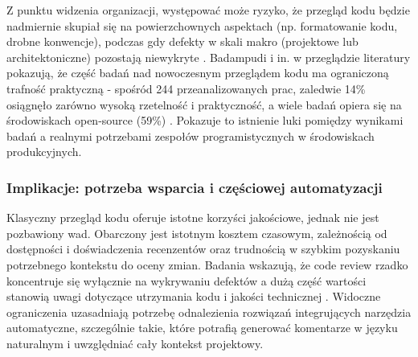 Z punktu widzenia organizacji, występować może ryzyko, że przegląd kodu będzie nadmiernie skupiał się na powierzchownych
aspektach (np. formatowanie kodu, drobne konwencje), podczas gdy defekty w skali makro (projektowe lub architektoniczne)
pozostają niewykryte \cite{bacchelli2013, czerwonka2015}.
Badampudi i in. w przeglądzie literatury pokazują, że część badań nad nowoczesnym przeglądem kodu ma ograniczoną trafność
praktyczną - spośród 244 przeanalizowanych prac, zaledwie 14\% osiągnęło zarówno wysoką rzetelność i praktyczność,
a wiele badań opiera się na środowiskach open-source (59\%) \cite{badampudi2023}.
Pokazuje to istnienie luki pomiędzy wynikami badań a realnymi potrzebami zespołów programistycznych w środowiskach produkcyjnych.

\subsubsection*{Implikacje: potrzeba wsparcia i częściowej automatyzacji}
Klasyczny przegląd kodu oferuje istotne korzyści jakościowe, jednak nie jest pozbawiony wad. Obarczony jest
istotnym kosztem czasowym, zależnością od dostępności i doświadczenia recenzentów oraz trudnością w szybkim pozyskaniu
potrzebnego kontekstu do oceny zmian. Badania wskazują, że code review rzadko koncentruje się wyłącznie na
wykrywaniu defektów a dużą część wartości stanowią uwagi dotyczące utrzymania kodu i jakości technicznej  \cite{bacchelli2013, czerwonka2015}.
Widoczne ograniczenia uzasadniają potrzebę odnalezienia rozwiązań integrujących narzędzia automatyczne, szczególnie takie, które
potrafią generować komentarze w języku naturalnym i uwzględniać cały kontekst projektowy.
